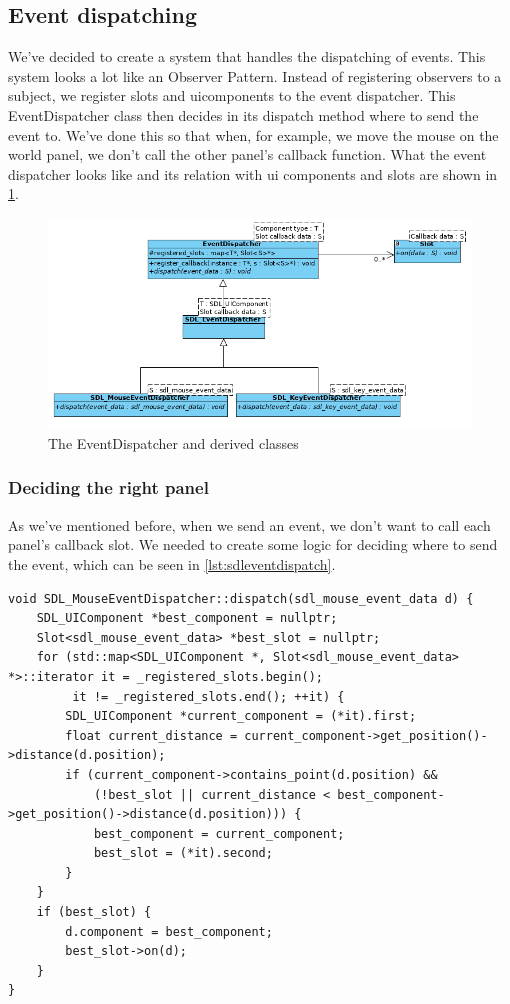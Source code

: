 \subsection{Event dispatching}
\label{sec:eventdispatch}
We've decided to create a system that handles the dispatching of events. This 
system looks a lot like an Observer Pattern. Instead of registering observers 
to a subject, we register slots and uicomponents to the event dispatcher.
This EventDispatcher class then decides in its dispatch method where to send 
the event to. We've done this so that when, for example, we move the mouse 
on the world panel, we don't call the other panel's callback function.
What the event dispatcher looks like and its relation with ui components and 
slots are shown in \cref{fig:eventdispatcher}.

\begin{figure}[!htb]
\centering
\includegraphics[scale=0.6]{res/events/eventdispatch.png}
\caption{The EventDispatcher and derived classes}\label{fig:eventdispatcher}
\end{figure}

\subsubsection{Deciding the right panel}
\label{sec:eventdispatcher-dispatch}
As we've mentioned before, when we send an event, we don't want to call each 
panel's callback slot. We needed to create some logic for deciding where to 
send the event, which can be seen in \cref{lst:sdleventdispatch}.
\\

\begin{lstlisting}[caption={SDL\_MouseEventDispatcher dispatch method.},
label={lst:sdleventdispatch}]
void SDL_MouseEventDispatcher::dispatch(sdl_mouse_event_data d) {
    SDL_UIComponent *best_component = nullptr;
    Slot<sdl_mouse_event_data> *best_slot = nullptr;
    for (std::map<SDL_UIComponent *, Slot<sdl_mouse_event_data> *>::iterator it = _registered_slots.begin();
         it != _registered_slots.end(); ++it) {
        SDL_UIComponent *current_component = (*it).first;
        float current_distance = current_component->get_position()->distance(d.position);
        if (current_component->contains_point(d.position) &&
            (!best_slot || current_distance < best_component->get_position()->distance(d.position))) {
            best_component = current_component;
            best_slot = (*it).second;
        }
    }
    if (best_slot) {
        d.component = best_component;
        best_slot->on(d);
    }
}
\end{lstlisting}
